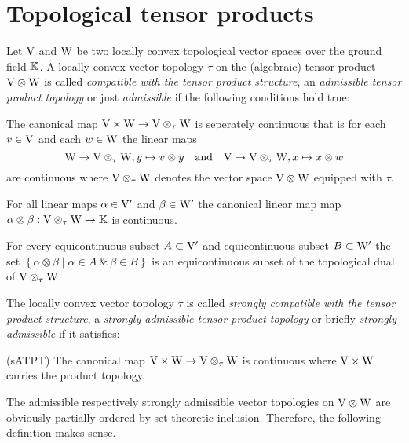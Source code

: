 %
\section{Topological tensor products}
\label{sec:topological-tensor-products}
\begin{definition}
  Let $\mathrm{V}$ and $\mathrm{W}$ be two locally convex topological vector spaces over the ground field $\mathbb{K}$. 
  A locally convex vector topology $\tau$ on the (algebraic) tensor product $\mathrm{V} \otimes \mathrm{W}$ 
  is called \emph{compatible with the tensor product structure}, an \emph{admissible tensor product topology}
  or just \emph{admissible}  if the following conditions hold true:
  \begin{axiomlist}[ATPT]
  \item
     The canonical map $\mathrm{V} \times \mathrm{W}  \to \mathrm{V} \otimes_\tau \mathrm{W}$ is seperately continuous
     that is  for each $v \in \mathrm{V}$ and each $w\in\mathrm{W}$ the linear maps 
     \[ \mathrm{W} \to  \mathrm{V} \otimes_\tau \mathrm{W}, y \mapsto v \otimes y \quad\text{and} \quad
        \mathrm{V} \to  \mathrm{V} \otimes_\tau \mathrm{W}, x \mapsto x \otimes w \]
     are continuous where $\mathrm{V} \otimes_\tau \mathrm{W} $ denotes the vector space 
     $\mathrm{V} \otimes \mathrm{W}$ equipped with $\tau$. 
  \item For all linear maps $\alpha \in \mathrm{V}'$ and $\beta \in \mathrm{W}'$ the canonical linear map 
     map $\alpha \otimes \beta :  \mathrm{V} \otimes_\tau \mathrm{W} \to  \mathbb{K}$
     is continuous. 
  \item For every equicontinuous subset $A \subset \mathrm{V}'$ and equicontinuous subset $B\subset \mathrm{W}'$
     the set $\left\{ \alpha \otimes \beta \mid \alpha \in A \:\&\: \beta \in B \right\}$ is an
     equicontinuous subset of the topological dual of $\mathrm{V} \otimes_\tau \mathrm{W}$. 
  \end{axiomlist}
  The locally convex vector topology $\tau$   
  is called \emph{strongly compatible with the tensor product structure}, 
  a \emph{strongly admissible tensor product topology} or briefly \emph{strongly admissible} 
  if it satisfies:
  \begin{axiomlist}[ATPT]
  \item[\textup{\sffamily (sATPT)}]
     The canonical map $\mathrm{V} \times \mathrm{W}  \to \mathrm{V} \otimes_\tau \mathrm{W}$ is continuous where
      $\mathrm{V} \times \mathrm{W}$ carries the product topology. 
  \end{axiomlist}
\end{definition}

\para
The admissible  respectively strongly admissible vector topologies on $ \mathrm{V} \otimes \mathrm{W}$ are obviously partially ordered 
by set-theoretic inclusion. Therefore, the following definition makes sense.

\begin{definition}
  
\end{definition}
